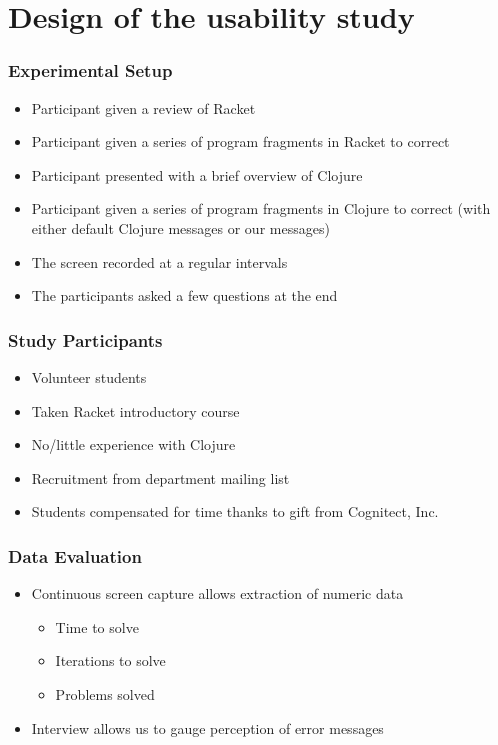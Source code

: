 \documentclass{beamer}
\begin{document}

\section{Design of the usability study} 

\begin{frame}
\frametitle{Experimental Setup}
	\begin{itemize}
		\item Participant given a review of Racket
		\item Participant given a series of program fragments in Racket to correct
		\item Participant presented with a brief overview of Clojure
		\item Participant given a series of  program fragments in Clojure to correct (with either default Clojure messages or our messages) 
		\item The screen recorded at a regular intervals
		\item The participants asked a few questions at the end
	\end{itemize}
\end{frame}

\begin{frame}
\frametitle{Study Participants}
	\begin{itemize}
		\item Volunteer students
		\item Taken Racket introductory course
		\item No/little experience with Clojure
		\item Recruitment from department mailing list
		\item Students compensated for time thanks to gift from Cognitect, Inc.
	\end{itemize}
\end{frame}

\begin{frame}
\frametitle{Data Evaluation}
	\begin{itemize}
		\item Continuous screen capture allows extraction of numeric data
			\begin{itemize}
				\item Time to solve
				\item Iterations to solve
				\item Problems solved
			\end{itemize}
		\item Interview allows us to gauge perception of error messages
	\end{itemize}
\end{frame}
\end{document}
